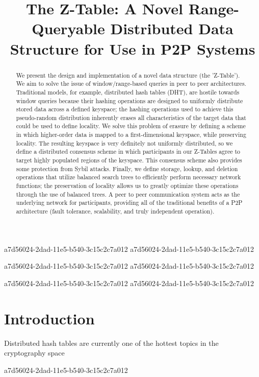 \documentclass[12pt]{article}
\title{The Z-Table: A Novel Range-Queryable Distributed Data Structure for Use in P2P Systems}
\begin{document}
a7d56024-2dad-11e5-b540-3c15c2c7a012
a7d56024-2dad-11e5-b540-3c15c2c7a012\maketitle
a7d56024-2dad-11e5-b540-3c15c2c7a012
a7d56024-2dad-11e5-b540-3c15c2c7a012\begin{abstract}
We present the design and implementation of a novel data structure (the 'Z-Table'). We aim to solve the issue of window/range-based queries in peer to peer architectures. Traditional models, for example,  distributed hash tables (DHT), are hostile towards window queries because their hashing operations are designed to uniformly distribute stored data across a defined keyspace; the hashing operations used to achieve this pseudo-random distribution inherently erases all characteristics of the target data that could be used to define locality. We solve this problem of erasure by defining a scheme in which higher-order data is mapped to a first-dimensional keyspace, while preserving locality. The resulting keyspace is very definitely not uniformly distributed, so we define a distributed consensus scheme in which participants in our Z-Tables agree to target highly populated regions of the keyspace. This consensus scheme also provides some protection from Sybil attacks. Finally, we define storage, lookup, and deletion operations that utilize balanced search trees to efficiently perform necessary network functions; the preservation of locality allows us to greatly optimize these operations through the use of balanced trees. A peer to peer communication system acts as the underlying network for participants, providing all of the traditional benefits of a P2P architecture (fault tolerance, scalability, and truly independent operation).
\end{abstract}


a7d56024-2dad-11e5-b540-3c15c2c7a012\newpage
a7d56024-2dad-11e5-b540-3c15c2c7a012\section{Introduction}
Distributed hash tables are currently one of the hottest topics in the cryptography space~\cite{Stoica:2001dj,Rowstron:2001ea,Ratnasamy:2001wn}

a7d56024-2dad-11e5-b540-3c15c2c7a012\printbibliography
\end{document}
